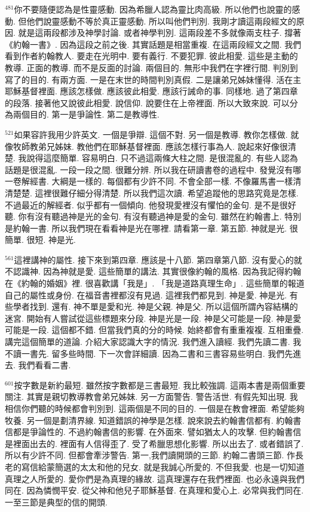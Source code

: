 \documentclass{book}
\begin{document}
$^{481}$你不要隨便認為是性靈感動.
因為希臘人認為靈比肉高級.
所以他們也說靈的感動.
但他們說靈感動不等於真正靈感動.
所以叫他們判別.
我剛才讀這兩段經文的原因.
就是這兩段都涉及神學討論.
或者神學判別.
這兩段差不多就像兩支柱子.
撐著《約翰一書》.
因為這段之前之後.
其實話題是相當重複.
在這兩段經文之間.
我們看到作者約翰教人.
要走在光明中.
要有義行.
不要犯罪.
彼此相愛.
這些是主動的教導.
正面的教導.
而不是反面的討論.
兩個目的.
無形中我們在字裡行間.
判別到寫了的目的.
有兩方面.
一是在末世的時間判別真假.
二是讓弟兄姊妹懂得.
活在主耶穌基督裡面.
應該怎樣做.
應該彼此相愛.
應該行誡命的事.
同樣地.
過了第四章的段落.
接著他又說彼此相愛.
說信仰.
說要住在上帝裡面.
所以大致來說.
可以分為兩個目的.
第一是爭論性.
第二是教導性.

$^{521}$如果容許我用少許英文.
一個是爭辯.
這個不對.
另一個是教導.
教你怎樣做.
就像牧師教弟兄姊妹.
教他們在耶穌基督裡面.
應該怎樣行事為人.
說起來好像很清楚.
我說得這麼簡單.
容易明白.
只不過這兩條大柱之間.
是很混亂的.
有些人認為話題是很混亂.
一段一段之間.
很難分辨.
所以我在研讀書卷的過程中.
發覺沒有哪一卷解經書.
大綱是一樣的.
每個都有少許不同.
不會全部一樣.
不像羅馬書一樣清清楚楚.
這裡很難仔細分得清楚.
所以我們這次讀.
希望追蹤他的思路究竟是怎樣.
不過最近的解經者.
似乎都有一個傾向.
他發現愛裡沒有懼怕的金句.
是不是很好聽.
你有沒有聽過神是光的金句.
有沒有聽過神是愛的金句.
雖然在約翰書上.
特別是約翰一書.
所以我們現在看看神是光在哪裡.
請看第一章.
第五節.
神就是光.
很簡單.
很短.
神是光.

$^{561}$這裡講神的屬性.
接下來到第四章.
應該是十八節.
第四章第八節.
沒有愛心的就不認識神.
因為神就是愛.
這些簡單的講法.
其實很像約翰的風格.
因為我記得約翰在《約翰的婚姻》裡.
很喜歡講「我是」.
「我是道路真理生命」.
這些簡單的報道自己的屬性或身份.
在福音書裡都沒有見過.
這裡我們都見到.
神是愛.
神是光.
有些學者找到.
還有.
神不單是愛和光.
神是父親.
神是父.
所以這個所謂內容結構的迷宮.
開始有人嘗試從這些標題來分段.
神是光是一段.
神是父可能是一段.
神是愛可能是一段.
這個都不錯.
但當我們真的分的時候.
始終都會有重重複複.
互相重疊.
講完這個簡單的道論.
介紹大家認識大字的情況.
我們進入讀經.
我們先讀二書.
我不讀一書先.
留多些時間.
下一次會詳細讀.
因為二書和三書容易些明白.
我們先進去.
我們看看二書.

$^{601}$按字數是新約最短.
雖然按字數都是三書最短.
我比較強調.
這兩本書是兩個重要關注.
其實是親切教導教會弟兄姊妹.
另一方面警告.
警告活世.
有假先知出現.
我相信你們聽的時候都會判別到.
這兩個是不同的目的.
一個是在教會裡面.
希望能夠牧養.
另一個是劃清界線.
知道錯誤的神學是怎樣.
說來說去約翰書信都有.
約翰書信都是爭論性的.
不過約翰書信的影響.
在外面來.
譬如猶太人的攻擊.
但約翰書信是裡面出去的.
裡面有人信得歪了.
受了希臘思想化影響.
所以出去了.
或者錯誤了.
所以有少許不同.
但都會牽涉警告.
第一,我們讀開頭的三節.
約翰二書頭三節.
作長老的寫信給蒙簡選的太太和他的兒女.
就是我誠心所愛的.
不但我愛.
也是一切知道真理之人所愛的.
愛你們是為真理的緣故.
這真理還存在我們裡面.
也必永遠與我們同在.
因為憐憫平安.
從父神和他兒子耶穌基督.
在真理和愛心上.
必常與我們同在.
一至三節是典型的信的開頭.
\end{document}
